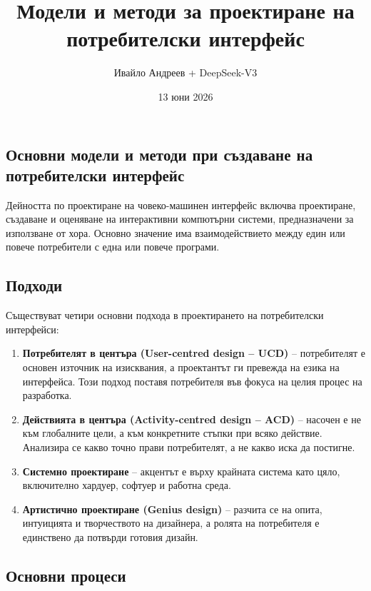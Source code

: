 \documentclass{scrartcl}
\title{Модели и методи за проектиране на потребителски интерфейс}
\author{Ивайло Андреев + DeepSeek-V3}
\date{13 юни 2026}
\begin{document}
\maketitle
\tableofcontents
\newpage

\begin{FlushLeft}

\section{Основни модели и методи при създаване на потребителски интерфейс}

Дейността по проектиране на човеко-машинен интерфейс включва проектиране, създаване и оценяване на интерактивни компютърни системи, предназначени за използване от хора. Основно значение има взаимодействието между един или повече потребители с една или повече програми.

\subsection{Подходи}

Съществуват четири основни подхода в проектирането на потребителски интерфейси:
\begin{enumerate}
    \item \textbf{Потребителят в центъра (User-centred design – UCD)} – потребителят е основен източник на изисквания, а проектантът ги превежда на езика на интерфейса. Този подход поставя потребителя във фокуса на целия процес на разработка.
    \item \textbf{Действията в центъра (Activity-centred design – ACD)} – насочен е не към глобалните цели, а към конкретните стъпки при всяко действие. Анализира се какво точно прави потребителят, а не какво иска да постигне.
    \item \textbf{Системно проектиране} – акцентът е върху крайната система като цяло, включително хардуер, софтуер и работна среда.
    \item \textbf{Артистично проектиране (Genius design)} – разчита се на опита, интуицията и творчеството на дизайнера, а ролята на потребителя е единствено да потвърди готовия дизайн.
\end{enumerate}

\subsection{Основни процеси}


\end{FlushLeft}
\end{document}
